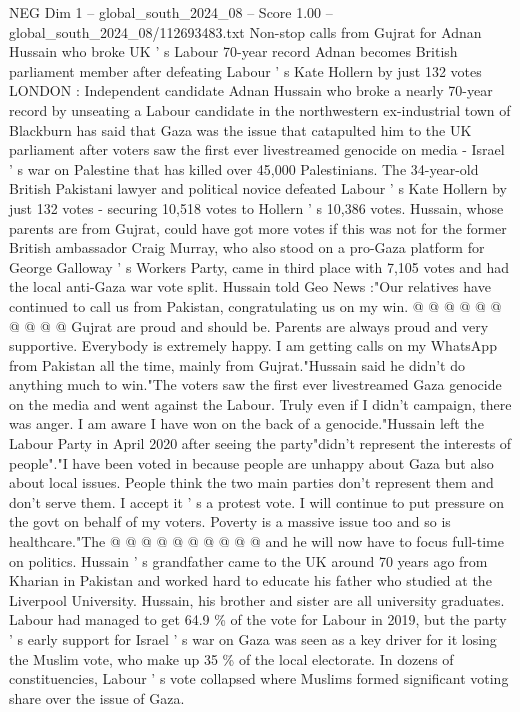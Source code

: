 \begin{textsample}{NEG Dim 1 – global\_south\_2024\_08 – Score 1.00 – global\_south\_2024\_08/112693483.txt}  \label{ex:f1_neg_122}
Non-stop calls from Gujrat for Adnan Hussain who broke UK ' s Labour 70-year record Adnan becomes British parliament member after defeating Labour ' s Kate Hollern by just 132 votes LONDON : Independent candidate Adnan Hussain who broke a nearly 70-year record by unseating a Labour candidate in the northwestern ex-industrial town of Blackburn has said that Gaza was the issue that catapulted him to the UK parliament after voters saw the first ever livestreamed genocide on media - Israel ' s war on Palestine that has killed over 45,000 Palestinians.
The 34-year-old British Pakistani lawyer and political novice defeated Labour ' s Kate Hollern by just 132 votes - securing 10,518 votes to Hollern ' s 10,386 votes.
Hussain, whose parents are from Gujrat, could have got more votes if this was not for the former British ambassador Craig Murray, who also stood on a pro-Gaza platform for George Galloway ' s Workers Party, came in third place with 7,105 votes and had the local anti-Gaza war vote split.
Hussain told Geo News :"Our relatives have continued to call us from Pakistan, congratulating us on my win. @ @ @ @ @ @ @ @ @ @ Gujrat are proud and should be.
Parents are always proud and very supportive.
Everybody is extremely happy.
I am getting calls on my WhatsApp from Pakistan all the time, mainly from Gujrat."Hussain said he didn't do anything much to win."The voters saw the first ever livestreamed Gaza genocide on the media and went against the Labour.
Truly even if I didn't campaign, there was anger.
I am aware I have won on the back of a genocide."Hussain left the Labour Party in April 2020 after seeing the party"didn't represent the interests of people"."I have been voted in because people are unhappy about Gaza but also about local issues.
People think the two main parties don't represent them and don't serve them.
I accept it ' s a protest vote.
I will continue to put pressure on the govt on behalf of my voters.
Poverty is a massive issue too and so is healthcare."The @ @ @ @ @ @ @ @ @ @ and he will now have to focus full-time on politics.
Hussain ' s grandfather came to the UK around 70 years ago from Kharian in Pakistan and worked hard to educate his father who studied at the Liverpool University.
Hussain, his brother and sister are all university graduates.
Labour had managed to get 64.9 \% of the vote for Labour in 2019, but the party ' s early support for Israel ' s war on Gaza was seen as a key driver for it losing the Muslim vote, who make up 35 \% of the local electorate.
In dozens of constituencies, Labour ' s vote collapsed where Muslims formed significant voting share over the issue of Gaza.

\end{textsample}
